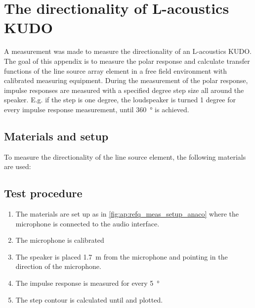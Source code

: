 \chapter{The directionality of L-acoustics KUDO}\label{ap:dir_of_kudo}
A measurement was made to measure the directionality of an L-acoustics KUDO.  The goal of this appendix is to measure the polar response and calculate transfer functions of the line source array element in a free field environment with calibrated measuring equipment. During the measurement of the polar response, impulse responses are measured with a specified degree step size all around the speaker. E.g. if the step is one degree, the loudspeaker is turned 1 degree for every impulse response measurement, until \SI{360}{\degree} is achieved.


\section*{Materials and setup}
To measure the directionality of the line source element, the following materials are used:

\startequipment
{}
\stopequipment




\section*{Test procedure}


\begin{enumerate}
\item The materials are set up as in \autoref{fig:ap:refq_meas_setup_anaco} where the  microphone is connected to the audio interface.
\item The microphone is calibrated
\item The speaker is placed \SI{1.7}{\meter} from the microphone and pointing in the direction of the microphone.
\item    The impulse response is measured for every \SI{5}{\degree}
\item The  step contour is calculated until  and plotted.
\end{enumerate}


